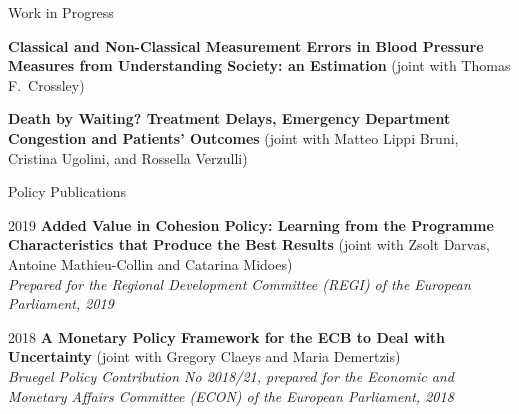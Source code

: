 \documentclass[5pt,a4paper]{article}
\begin{document}
\begin{cv}{}
\begin{cvlist}{Work in Progress}
    \item[] \normalsize
    \textbf{Classical and Non-Classical Measurement Errors in Blood Pressure Measures from Understanding Society: an Estimation} (joint with Thomas F.\ Crossley)\\
    \item[] \normalsize
    \textbf{Death by Waiting? Treatment Delays, Emergency Department Congestion and Patients’ Outcomes} (joint with Matteo Lippi Bruni, Cristina Ugolini, and Rossella Verzulli)\\
\begin{comment}        
        \footnotesize In surveys, it is seldom possible to obtain the most accurate available measure of any variable of interest, given the high costs (monetary and not) associated to the necessary procedures. In the context of Understanding Society, we consider the setting of blood pressure measurements as gathered by nurses and compare them with self-taken and interviewer-taken ones. Assuming classical measurement error for nurse-taken measures and non-classical error for the other two sources, we estimate the parameters of interest through Generalised Method of Moments (GMM) in order to correct for any possible bias in measures exhibiting non-classical error.
\end{comment}
\end{cvlist}
\begin{cvlist}{Policy Publications}	
\item[\small 2019] \small \normalsize 
    \textbf{Added Value in Cohesion Policy: Learning from the Programme Characteristics that Produce the Best Results} (joint with Zsolt Darvas, Antoine Mathieu-Collin and Catarina Midoes)\\
    \textit{Prepared for the Regional Development Committee (REGI) of the European Parliament, 2019}

\item[\small 2018] \normalsize 
    \textbf{A Monetary Policy Framework for the ECB to Deal with Uncertainty} (joint with Gregory Claeys and Maria Demertzis)\\
    \textit{Bruegel Policy Contribution No 2018/21, prepared for the Economic and Monetary Affairs Committee (ECON) of the European Parliament, 2018}

\end{cvlist}


\end{cv}
\end{document}
